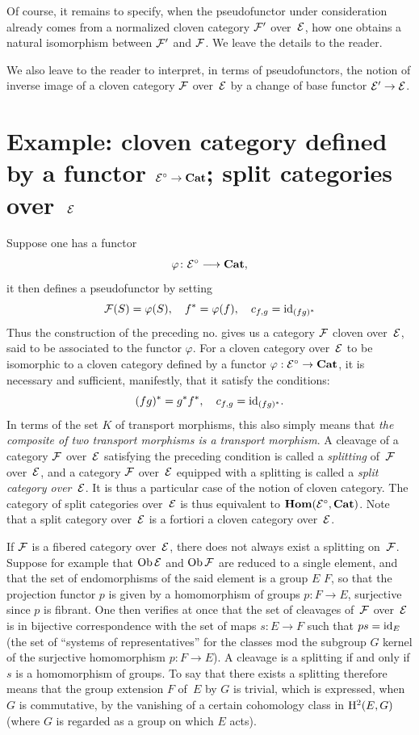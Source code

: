 Of course, it remains to specify, when the pseudofunctor
under consideration already comes from a normalized cloven
category $\cal{F}'$ over~$\cal{E}$, how one obtains a
natural isomorphism between $\cal{F}'$ and $\cal{F}$. We leave the
details to the reader.

We also leave to the reader to interpret, in terms of
pseudofunctors, the notion of inverse image of a cloven
category $\cal{F}$ over~$\cal{E}$ by a change of base functor
$\cal{E}' \to\cal{E}$.

\section[Example]{Example: cloven category defined by a functor
$\cal{E}^\circ\to\Cat$; split categories over~$\cal{E}$}
\label{VI.9}
Suppose one has a functor
$$
\varphi\colon\cal{E}^\circ\to\Cat,
$$
it then defines a pseudofunctor by setting
$$
\cal{F}(S)=\varphi(S),
\quad f^*=\varphi(f),\quad c_{f,g}=\id_{(fg)^*}
$$
Thus the construction of the preceding no. gives us a
category $\cal{F}$ cloven over~$\cal{E}$, said to be associated to the
functor $\varphi$. For a cloven category over~$\cal{E}$
to be isomorphic to a cloven category defined by a
functor $\varphi:\cal{E}^\circ\to\Cat$, it is necessary and sufficient,
manifestly, that it satisfy the conditions:
$$
(fg)^*=g^*f^*,\quad c_{f,g}=\id_{(fg)^*}\quoi.
$$
In terms of the set $K$ of transport morphisms, this also simply
means that \emph{the composite of two transport
morphisms is a transport morphism}. A cleavage of a
category $\cal{F}$ over~$\cal{E}$ satisfying the preceding
condition is called a \emph{splitting}
of~$\cal{F}$ over~$\cal{E}$, and a category $\cal{F}$
over~$\cal{E}$ equipped with a splitting is called a
\emph{split category over~$\cal{E}$}.
It is thus a particular case of the notion of
cloven category. The category of split categories
over~$\cal{E}$ is thus equivalent to
$\SheafHom(\cal{E}^\circ,\Cat)$. Note that a
split category over~$\cal{E}$ is a fortiori a cloven category
over~$\cal{E}$.

If $\cal{F}$ is a fibered category over~$\cal{E}$, there
does not always exist a splitting on~$\cal{F}$. Suppose for example
that $\Ob\cal{E}$ and $\Ob\cal{F}$ are reduced to a
single element, and that the set of endomorphisms of the said element is a
group $E$ \resp $F$, so that the projection functor $p$ is
given by a homomorphism of groups $p\colon F\to E$, surjective
since $p$ is fibrant. One then verifies at once that
the set of cleavages of~$\cal{F}$ over~$\cal{E}$ is in
bijective correspondence with the set of maps $s\colon
E\to F$ such that $ps=\id_E$ (\ie the set of ``systems of
representatives'' for the classes mod the subgroup $G$ kernel of
the surjective homomorphism $p\colon F\to E$). A cleavage is a
splitting if and only if $s$ is a homomorphism of groups. To say
that there exists a splitting therefore means that the group extension $F$
of~$E$ by $G$ is trivial, which is expressed, when $G$ is
commutative, by the vanishing of a certain cohomology class
in $\H^2(E,G)$ (where $G$ is regarded as a group
on which $E$ acts).

